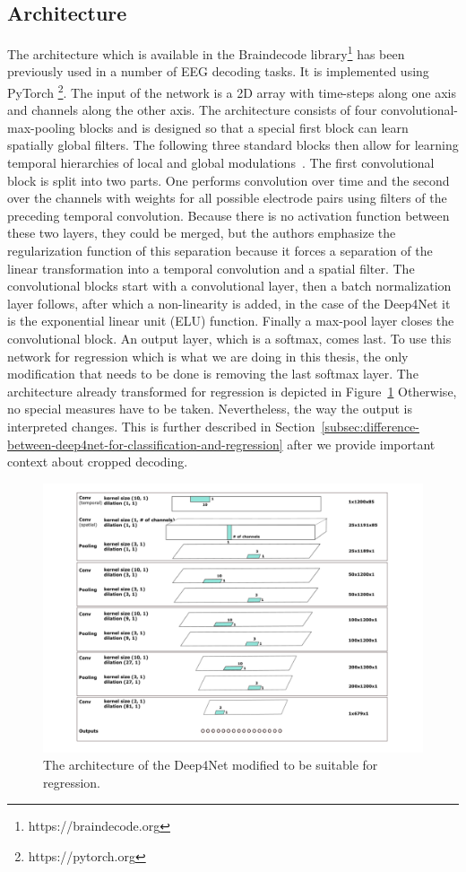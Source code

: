 \subsection{Architecture}\label{subsec:architecture}
The architecture which is available in the Braindecode library\footnote{https://braindecode.org} has been previously used in a number of EEG decoding tasks\cite{Hammer-2021, schirrmeister-deep-2017, hartmann-hierarchical-2018}.
It is implemented using PyTorch \footnote{https://pytorch.org}.
The input of the network is a 2D array with time-steps along one axis and channels along the other axis.
The architecture consists of four convolutional-max-pooling blocks and is designed so that a special first block can learn spatially global filters.
The following three standard blocks then allow for learning temporal hierarchies of local and global modulations~\cite{schirrmeister-deep-2017}.
The first convolutional block is split into two parts.
One performs convolution over time and the second over the channels with weights for all possible electrode pairs using filters of the preceding temporal convolution.
Because there is no activation function between these two layers, they could be merged, but the authors emphasize the regularization function of this separation because it forces a separation of the linear transformation into a temporal convolution and a spatial filter.
The convolutional blocks start with a convolutional layer, then a batch normalization layer follows, after which a non-linearity is added, in the case of the Deep4Net it is the exponential linear unit (ELU) function\cite{clevert-elu-2016}.
Finally a max-pool layer closes the convolutional block.
An output layer, which is a softmax, comes last.
To use this network for regression which is what we are doing in this thesis, the only modification that needs to be done is removing the last softmax layer.
The architecture already transformed for regression is depicted in Figure~\ref{fig:architecture}
Otherwise, no special measures have to be taken.
Nevertheless, the way the output is interpreted changes.
This is further described in Section~\ref{subsec:difference-between-deep4net-for-classification-and-regression} after we provide important context about cropped decoding.

\begin{figure}
\centering
\includegraphics[width=.6\linewidth]{img/ch3/architektura}
\caption{The architecture of the Deep4Net modified to be suitable for regression.}
\label{fig:architecture}
\end{figure}

